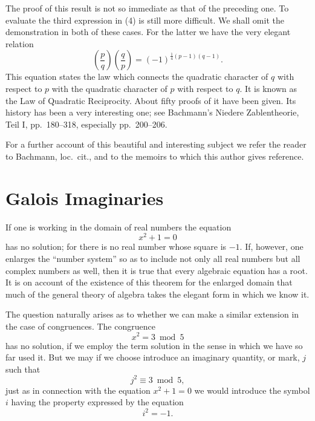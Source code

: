 \documentclass[oneside]{book}
\begin{document}
The proof of this result is not so immediate as that of the
preceding one. To evaluate the third expression in (4) is still more
difficult. We shall omit the demonstration in both of these cases.
For the latter we have the very elegant relation
\begin{equation*}
\left( \frac{p}{q} \right ) \left( \frac{q}{p} \right ) =
  (-1)^{\frac{1}{4}(p-1)(q-1)}.
\end{equation*}
This equation states the law which connects the quadratic character
of $q$ with respect to $p$ with the quadratic character of $p$ with
respect to $q$. It is known as the Law of Quadratic Reciprocity.
About fifty proofs of it have been given. Its history has been a
very interesting one; see Bachmann's Niedere Zablentheorie, Teil I,
pp.\ 180--318, especially pp.\ 200--206.%

For a further account of this beautiful and interesting subject we
refer the reader to Bachmann, loc.\ cit., and to the memoirs to
which this author gives reference.

\section{Galois Imaginaries}\label{s42}%

If one is working in the domain of real numbers the equation
\begin{equation*}
x^2 + 1 = 0
\end{equation*}
has no solution; for there is no real number whose square is $-1$.
If, however, one enlarges the ``number system'' so as to include not
only all real numbers but all complex numbers as well, then it is
true that every algebraic equation has a root. It is on account of
the existence of this theorem for the enlarged domain that much of
the general theory of algebra takes the elegant form in which we
know it.

The question naturally arises as to whether we can make a similar
extension in the case of congruences. The congruence
\begin{equation*}
x^2 = 3 \bmod 5
\end{equation*}
has no solution, if we employ the term solution in the sense in
which we have so far used it. But we may if we choose introduce an
imaginary quantity, or mark, $j$ such that
\begin{equation*}
j^2 \equiv 3 \bmod 5,
\end{equation*}
just as in connection with the equation $x^2 + 1 = 0$ we would
introduce the symbol $i$ having the property expressed by the
equation
\begin{equation*}
i^2 = -1.
\end{equation*}
\end{document}
